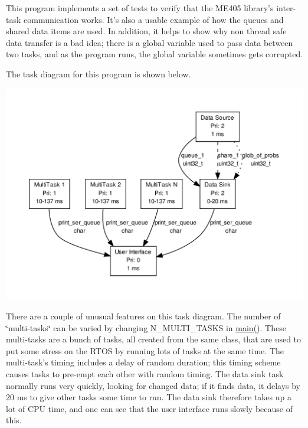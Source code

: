 \-This program implements a set of tests to verify that the \-M\-E405 library's inter-\/task communication works. \-It's also a usable example of how the queues and shared data items are used. \-In addition, it helps to show why non thread safe data transfer is a bad idea; there is a global variable used to pass data between two tasks, and as the program runs, the global variable sometimes gets corrupted.

\-The task diagram for this program is shown below. \begin{center}

\begin{DoxyImageNoCaption}
  \mbox{\includegraphics[width=\textwidth]{dot_inline_dotgraph_1}}
\end{DoxyImageNoCaption}
\end{center}
 \-There are a couple of unusual features on this task diagram. \-The number of \char`\"{}multi-\/tasks\char`\"{} can be varied by changing {\ttfamily \-N\-\_\-\-M\-U\-L\-T\-I\-\_\-\-T\-A\-S\-K\-S} in {\ttfamily \hyperlink{test__main_8cpp_a840291bc02cba5474a4cb46a9b9566fe}{main()}}. \-These multi-\/tasks are a bunch of tasks, all created from the same class, that are used to put some stress on the \-R\-T\-O\-S by running lots of tasks at the same time. \-The multi-\/task's timing includes a delay of random duration; this timing scheme causes tasks to pre-\/empt each other with random timing. \-The data sink task normally runs very quickly, looking for changed data; if it finds data, it delays by 20 ms to give other tasks some time to run. \-The data sink therefore takes up a lot of \-C\-P\-U time, and one can see that the user interface runs slowly because of this.

